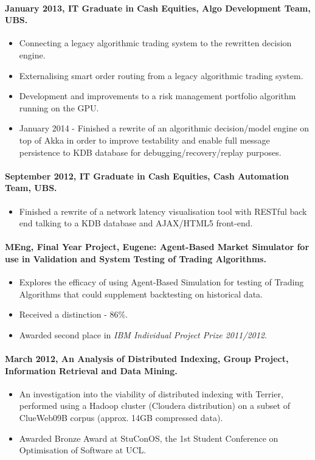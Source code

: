 \documentclass[11pt, a4paper]{article}
\newlength{\wideitemsep}
\let\olditem\item
\renewcommand{\item}{\setlength{\itemsep}{\wideitemsep}\olditem}
\begin{document}
\paragraph{January 2013, IT Graduate in Cash Equities, Algo Development Team, UBS.}
\begin{itemize}
\item Connecting a legacy algorithmic trading system to the rewritten decision engine.
\item Externalising smart order routing from a legacy algorithmic trading system.
\item Development and improvements to a risk management portfolio algorithm running on the GPU.
\item January 2014 - Finished a rewrite of an algorithmic decision/model engine on top of Akka in order to improve testability and enable full message persistence to KDB database for debugging/recovery/replay purposes. 
\end{itemize}

\paragraph{September 2012, IT Graduate in Cash Equities, Cash Automation Team, UBS.}
\begin{itemize}
\item Finished a rewrite of a network latency visualisation tool with RESTful back end talking to a KDB database and AJAX/HTML5 front-end.  
\end{itemize}

\paragraph{MEng, Final Year Project, Eugene: Agent-Based Market Simulator for use in Validation and System Testing of Trading Algorithms.} 
\begin{itemize}
\item Explores the efficacy of using Agent-Based Simulation for testing of Trading Algorithms that could supplement backtesting on historical data.
\item Received a distinction - 86\%.
\item Awarded second place in \textit{IBM Individual Project Prize 2011/2012}.
\end{itemize}

\paragraph{March 2012, An Analysis of Distributed Indexing, Group Project, Information Retrieval and Data Mining.}
\begin{itemize}
\item An investigation into the viability of distributed indexing with Terrier, performed using a Hadoop cluster (Cloudera distribution) on a subset of ClueWeb09B corpus (approx. 14GB compressed data).
\item Awarded Bronze Award at StuConOS, the 1st Student Conference on Optimisation of Software at UCL.
\end{itemize}
\end{document}
